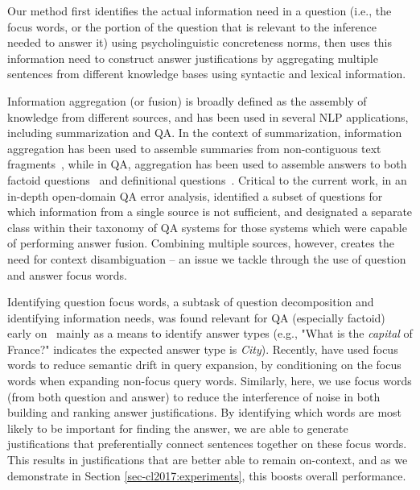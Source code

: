 Our method first identifies the actual information need in a question (i.e., the focus words, or the portion of the question that is relevant to the inference needed to answer it) using psycholinguistic concreteness norms, then uses this information need to construct answer justifications by aggregating multiple sentences from different knowledge bases using syntactic and lexical information.  

Information aggregation (or fusion) is broadly defined as the assembly of knowledge from different sources, and has been used in several NLP applications, including summarization and QA.  In the context of summarization, information aggregation has been used to assemble summaries from non-contiguous text fragments~\citep[inter alia]{barzilay1999information,barzilay2005sentence}, while in QA, aggregation has been used to assemble answers to both factoid questions~\citep{pradhan2002building} and definitional questions~\citep{blair2003hybrid}.  Critical to the current work, in an in-depth open-domain QA error analysis, \citet{Moldovan:2003:PIE:763693.763694} identified a subset of questions for which information from a single source is not sufficient, and designated a separate class within their taxonomy of QA systems for those systems which were capable of performing answer fusion. Combining multiple sources, however, creates the need for context disambiguation -- an issue we tackle through the use of question and answer focus words.

Identifying question focus words, a subtask of question decomposition and identifying information needs, was found relevant for QA (especially factoid) early on~\citep[inter alia]{Harabagiu:00,Moldovan:2003:PIE:763693.763694} mainly as a means to identify answer types (e.g., "What is the {\em capital} of France?" indicates the expected answer type is \emph{City}).  
Recently, \citet{Park:2015} have used focus words to reduce semantic drift in query expansion, by conditioning on the focus words when expanding non-focus query words.
Similarly, here, we use focus words (from both question and answer) to reduce the interference of noise in both building and ranking answer justifications.  By identifying which words are most likely to be important for finding the answer, we are able to generate justifications that preferentially connect sentences together on these focus words.  This results in justifications that are better able to remain on-context, and as we demonstrate in Section \ref{sec-cl2017:experiments}, this boosts overall performance. 

